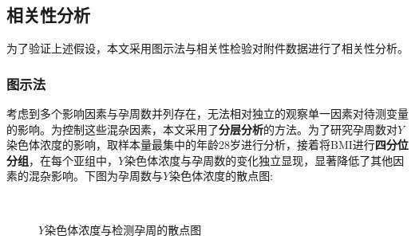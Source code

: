 \documentclass[12pt]{ctexart}
\begin{document}
	\subsection{相关性分析}
	为了验证上述假设，本文采用图示法与相关性检验对附件数据进行了相关性分析。
	
	\subsubsection{图示法}
	考虑到多个影响因素与孕周数并列存在，无法相对独立的观察单一因素对待测变量的影响。为控制这些混杂因素，本文采用了\textbf{分层分析}的方法。为了研究孕周数对$Y$染色体浓度的影响，取样本量最集中的年龄28岁进行分析，接着将BMI进行\textbf{四分位分组}，在每个亚组中，$Y$染色体浓度与孕周数的变化独立显现，显著降低了其他因素的混杂影响。下图为孕周数与$Y$染色体浓度的散点图:
	\begin{figure}[htbp]
		\centering
		 \\[1ex]
		\caption{$Y$染色体浓度与检测孕周的散点图}
	\end{figure}
	
\end{document}
